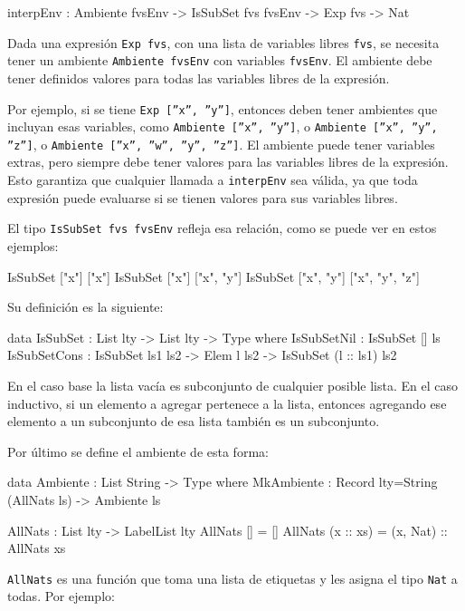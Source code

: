 \begin{code}
interpEnv : Ambiente fvsEnv -> IsSubSet fvs fvsEnv ->
  Exp fvs -> Nat
\end{code}

Dada una expresión \texttt{Exp fvs}, con una lista de variables libres \texttt{fvs}, se necesita tener un ambiente \texttt{Ambiente fvsEnv} con variables \texttt{fvsEnv}. El ambiente debe tener definidos valores para todas las variables libres de la expresión.

Por ejemplo, si se tiene \texttt{Exp [''x'', ''y'']}, entonces deben tener ambientes que incluyan esas variables, como \texttt{Ambiente [''x'', ''y'']}, o \texttt{Ambiente [''x'', ''y'', ''z'']}, o \texttt{Ambiente [''x'', ''w'', ''y'', ''z'']}. El ambiente puede tener variables extras, pero siempre debe tener valores para las variables libres de la expresión. Esto garantiza que cualquier llamada a \texttt{interpEnv} sea válida, ya que toda expresión puede evaluarse si se tienen valores para sus variables libres.

El tipo \texttt{IsSubSet fvs fvsEnv} refleja esa relación, como se puede ver en estos ejemplos:

\begin{code}
IsSubSet ["x"] ["x"]
IsSubSet ["x"] ["x", "y"]
IsSubSet ["x", "y"] ["x", "y", "z"]
\end{code}

Su definición es la siguiente:

\begin{code}
data IsSubSet : List lty -> List lty -> Type where
  IsSubSetNil : IsSubSet [] ls
  IsSubSetCons : IsSubSet ls1 ls2 -> Elem l ls2 ->
    IsSubSet (l :: ls1) ls2
\end{code}

En el caso base la lista vacía es subconjunto de cualquier posible lista. En el caso inductivo, si un elemento a agregar pertenece a la lista, entonces agregando ese elemento a un subconjunto de esa lista también es un subconjunto.

Por último se define el ambiente de esta forma:

\begin{code}
data Ambiente : List String -> Type where
  MkAmbiente : Record {lty=String} (AllNats ls) -> Ambiente ls

AllNats : List lty -> LabelList lty
AllNats [] = []
AllNats (x :: xs) = (x, Nat) :: AllNats xs
\end{code}

\texttt{AllNats} es una función que toma una lista de etiquetas y les asigna el tipo \texttt{Nat} a todas. Por ejemplo:

